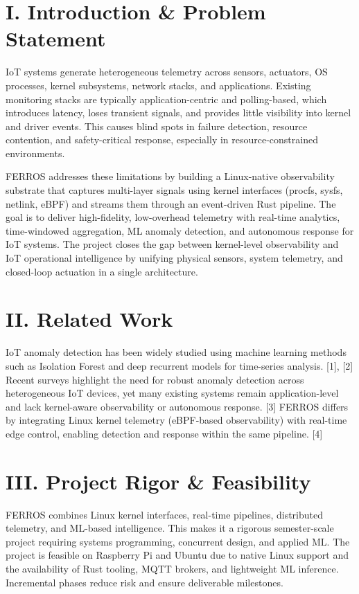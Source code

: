 \documentclass[11pt]{article}
\begin{document}
\section*{I. Introduction \& Problem Statement}
IoT systems generate heterogeneous telemetry across sensors, actuators, OS processes, kernel subsystems, network stacks, and applications. Existing monitoring stacks are typically application-centric and polling-based, which introduces latency, loses transient signals, and provides little visibility into kernel and driver events. This causes blind spots in failure detection, resource contention, and safety-critical response, especially in resource-constrained environments.

FERROS addresses these limitations by building a Linux-native observability substrate that captures multi-layer signals using kernel interfaces (procfs, sysfs, netlink, eBPF) and streams them through an event-driven Rust pipeline. The goal is to deliver high-fidelity, low-overhead telemetry with real-time analytics, time-windowed aggregation, ML anomaly detection, and autonomous response for IoT systems. The project closes the gap between kernel-level observability and IoT operational intelligence by unifying physical sensors, system telemetry, and closed-loop actuation in a single architecture.

\section*{II. Related Work}
IoT anomaly detection has been widely studied using machine learning methods such as Isolation Forest and deep recurrent models for time-series analysis. [1], [2] Recent surveys highlight the need for robust anomaly detection across heterogeneous IoT devices, yet many existing systems remain application-level and lack kernel-aware observability or autonomous response. [3] FERROS differs by integrating Linux kernel telemetry (eBPF-based observability) with real-time edge control, enabling detection and response within the same pipeline. [4]

\section*{III. Project Rigor \& Feasibility}
FERROS combines Linux kernel interfaces, real-time pipelines, distributed telemetry, and ML-based intelligence. This makes it a rigorous semester-scale project requiring systems programming, concurrent design, and applied ML. The project is feasible on Raspberry Pi and Ubuntu due to native Linux support and the availability of Rust tooling, MQTT brokers, and lightweight ML inference. Incremental phases reduce risk and ensure deliverable milestones.
\end{document}
